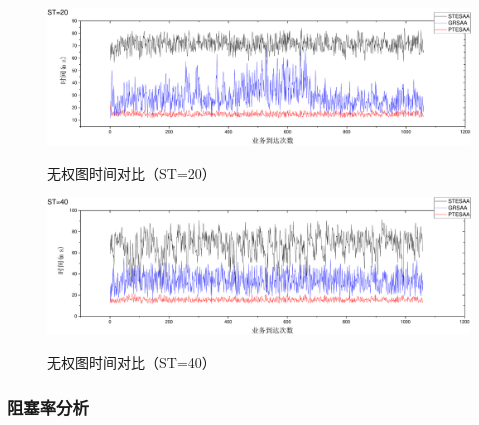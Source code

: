\begin{figure}
\vspace{-0.5cm}
\setlength{\abovecaptionskip}{-0.5cm}
\begin{center}
{\includegraphics[width=1 \textwidth]{figures/B20T.pdf}}
\end{center}
\caption{{\footnotesize{无权图时间对比（ST=20）}}}
\label{B20T}
\end{figure}
\begin{figure}
\vspace{-0.5cm}
\setlength{\abovecaptionskip}{-0.5cm}
\begin{center}
{\includegraphics[width=1 \textwidth]{figures/B40T.pdf}}
\end{center}
\caption{{\footnotesize{无权图时间对比（ST=40）}}}
\label{B40T}
\end{figure}
\subsubsection{阻塞率分析}

